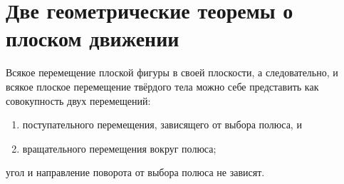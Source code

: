 \section{Две геометрические теоремы о плоском движении}

\begin{theorem}[Шаля]
  \label{theorem:chasles}
  Всякое перемещение плоской фигуры в своей плоскости, а следовательно, и всякое
  плоское перемещение твёрдого тела можно себе представить как совокупность двух
  перемещений:
  \begin{enumerate}
    \item поступательного перемещения, зависящего от выбора полюса, и
    \item вращательного перемещения вокруг полюса;
  \end{enumerate}
  угол и направление поворота от выбора полюса не зависят.
\end{theorem}


